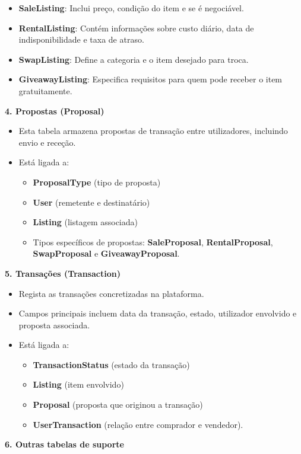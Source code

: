 \documentclass[a4paper, 12pt]{article} %
\begin{document}
\begin{itemize}
    \item \textbf{SaleListing}: Inclui preço, condição do item e se é negociável.
    \item \textbf{RentalListing}: Contém informações sobre custo diário, data de indisponibilidade e taxa de atraso.
    \item \textbf{SwapListing}: Define a categoria e o item desejado para troca.
    \item \textbf{GiveawayListing}: Especifica requisitos para quem pode receber o item gratuitamente.
\end{itemize}
\textbf{4. Propostas (Proposal)}

\begin{itemize}
    \item Esta tabela armazena propostas de transação entre utilizadores, incluindo envio e receção.
    \item Está ligada a:
    \begin{itemize}
        \item \textbf{ProposalType} (tipo de proposta)
        \item \textbf{User} (remetente e destinatário)
        \item \textbf{Listing} (listagem associada)
        \item Tipos específicos de propostas: \textbf{SaleProposal}, \textbf{RentalProposal}, \textbf{SwapProposal} e \textbf{GiveawayProposal}.
    \end{itemize}
\end{itemize}
\textbf{5. Transações (Transaction)}

\begin{itemize}
    \item Regista as transações concretizadas na plataforma.
    \item Campos principais incluem data da transação, estado, utilizador envolvido e proposta associada.
    \item Está ligada a:
    \begin{itemize}
        \item \textbf{TransactionStatus} (estado da transação)
        \item \textbf{Listing} (item envolvido)
        \item \textbf{Proposal} (proposta que originou a transação)
        \item \textbf{UserTransaction} (relação entre comprador e vendedor).
    \end{itemize}
\end{itemize}
\textbf{6. Outras tabelas de suporte}
\end{document}
